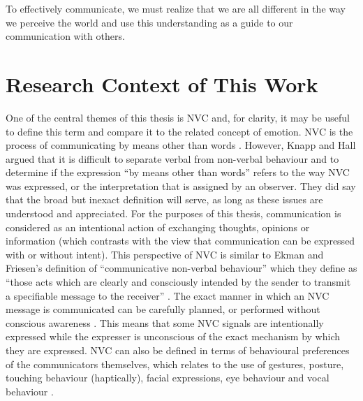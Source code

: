 \begin{savequote}
To effectively communicate, we must realize that we are all different in the way we perceive the world and use this understanding as a guide to our communication with others.
\end{savequote}

\chapter[Research Context of This Work]{Research Context of This Work}
\label{ChapterLiteratureReview}


\label{BackgroundFramingClassificationProblem}



\label{BackgroundHowIsNvcExpressed}
\label{BackgroundCompareContrastEmotionWithNvc}

One of the central themes of this thesis is \acf{NVC} and, for clarity, it may be useful to define this term and compare it to the related concept of emotion. \ac{NVC} is the process of communicating by means other than words \cite{Knapp2009}. However, Knapp and Hall \cite{Knapp2009} argued that it is difficult to separate verbal from non-verbal behaviour and to determine if the expression ``by means other than words'' refers to the way \ac{NVC} was expressed, or the interpretation that is assigned by an observer. They did say that the broad but inexact definition will serve, as long as these issues are understood and appreciated. For the purposes of this thesis, communication is considered as an intentional \cite{Jandt2004, Pearce1987} action of exchanging thoughts, opinions or information (which contrasts with the view that communication can be expressed with or without intent). This perspective of \ac{NVC} is similar to Ekman and Friesen's definition of ``communicative non-verbal behaviour'' which they define as ``those acts which are clearly and consciously intended by the sender to transmit a specifiable message to the receiver'' \cite{Ekman1969}. The exact manner in which an \ac{NVC} message is communicated can be carefully planned, or performed without conscious awareness \cite{Knapp2009, Lehtonen1981}. This means that some \ac{NVC} signals are intentionally expressed while the expresser is unconscious of the exact mechanism by which they are expressed. \ac{NVC} can also be defined in terms of behavioural preferences of the communicators themselves, which relates to the use of gestures, posture, touching behaviour (haptically), facial expressions, eye behaviour and vocal behaviour \cite{Knapp2009}.

